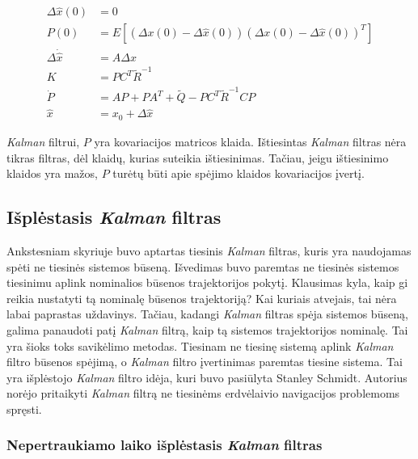     \begin{equation}
        \label{eq:linerialized_kalman_filter}
        \begin{aligned}
            \Delta \hat{x} (0) &= 0\\
            P(0) &= E[(\Delta x(0) - \Delta \hat{x}(0))(\Delta{x}(0) - \Delta \hat{x}(0))^T]\\
            \Delta \dot{\hat{x}} &= A \Delta \hat{x} \\
            K &= PC^T\tilde{R}^{-1}\\
            \dot{P} &= AP + PA^T + \tilde{Q} - PC^T\tilde{R}^{-1}CP\\
            \hat{x} &= x_0 + \Delta \hat{x}
        \end{aligned}
    \end{equation}

    \textit{Kalman} filtrui, $P$ yra kovariacijos matricos klaida.
    Ištiesintas \textit{Kalman} filtras nėra tikras filtras, dėl klaidų, kurias suteikia ištiesinimas.
    Tačiau, jeigu ištiesinimo klaidos yra mažos, $P$ turėtų būti apie spėjimo klaidos kovariacijos įvertį.


\subsection{Išplėstasis \textit{Kalman} filtras}

    Ankstesniam skyriuje buvo aptartas tiesinis \textit{Kalman} filtras, kuris yra naudojamas spėti ne tiesinės sistemos būseną.
    Išvedimas buvo paremtas ne tiesinės sistemos tiesinimu aplink nominalios būsenos trajektorijos pokytį.
    Klausimas kyla, kaip gi reikia nustatyti tą nominalę būsenos trajektoriją?
    Kai kuriais atvejais, tai nėra labai paprastas uždavinys.
    Tačiau, kadangi \textit{Kalman} filtras spėja sistemos būseną, galima panaudoti patį \textit{Kalman} filtrą, kaip tą sistemos trajektorijos nominalę.
    Tai yra šioks toks savikėlimo metodas.
    Tiesinam ne tiesinę sistemą aplink \textit{Kalman} filtro būsenos spėjimą, o \textit{Kalman} filtro įvertinimas paremtas tiesine sistema.
    Tai yra išplėstojo \textit{Kalman} filtro idėja, kuri buvo pasiūlyta Stanley Schmidt.
    Autorius norėjo pritaikyti \textit{Kalman} filtrą ne tiesinėms erdvėlaivio navigacijos problemoms spręsti.

\subsubsection{Nepertraukiamo laiko išplėstasis \textit{Kalman} filtras}

